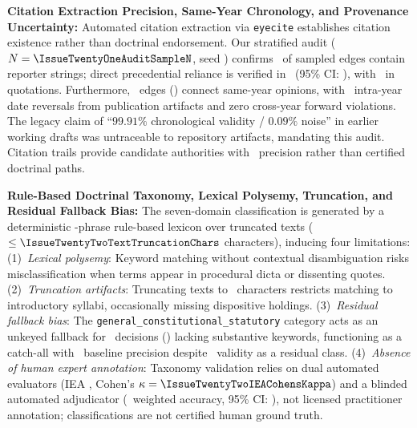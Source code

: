 \item \textbf{Citation Extraction Precision, Same-Year Chronology, and Provenance Uncertainty:}
Automated citation extraction via \texttt{eyecite} establishes citation existence rather than doctrinal endorsement. Our stratified audit ($N=\IssueTwentyOneAuditSampleN$, seed \IssueTwentyOneAuditSeed) confirms \IssueTwentyOneAuditCitationPresentPct\ of sampled edges contain reporter strings; direct precedential reliance is verified in \IssueTwentyOneAuditTargetConfirmedPct\ (95\% CI: \IssueTwentyOneAuditTargetConfirmedCI), with \IssueTwentyOneAuditQuotationPct\ in quotations. Furthermore, \IssueTwentyOneSameYearEdges\ edges (\IssueTwentyOneSameYearEdgesPct) connect same-year opinions, with \IssueTwentyOneIntraYearReversals\ intra-year date reversals from publication artifacts and zero cross-year forward violations. The legacy claim of ``$99.91\%$ chronological validity / $0.09\%$ noise'' in earlier working drafts was untraceable to repository artifacts, mandating this audit. Citation trails provide candidate authorities with \IssueTwentyOneAuditTargetConfirmedPct\ precision rather than certified doctrinal paths.

\item \textbf{Rule-Based Doctrinal Taxonomy, Lexical Polysemy, Truncation, and Residual Fallback Bias:}
The seven-domain classification is generated by a deterministic \IssueTwentyTwoTotalLexiconPhrases-phrase rule-based lexicon over truncated texts ($\le \IssueTwentyTwoTextTruncationChars$ characters), inducing four limitations: (1)~\textit{Lexical polysemy}: Keyword matching without contextual disambiguation risks misclassification when terms appear in procedural dicta or dissenting quotes. (2)~\textit{Truncation artifacts}: Truncating texts to \IssueTwentyTwoTextTruncationChars\ characters restricts matching to introductory syllabi, occasionally missing dispositive holdings. (3)~\textit{Residual fallback bias}: The \texttt{general\_constitutional\_statutory} category acts as an unkeyed fallback for \IssueTwentyTwoGeneralConstitutionalCorpus\ decisions (\IssueTwentyTwoGeneralConstitutionalCorpusPct) lacking substantive keywords, functioning as a catch-all with \IssueTwentyTwoGeneralConstitutionalBaselineAcc\ baseline precision despite \IssueTwentyTwoFallbackValidityPct\ validity as a residual class. (4)~\textit{Absence of human expert annotation}: Taxonomy validation relies on dual automated evaluators (IEA \IssueTwentyTwoIEARawAgreement, Cohen's $\kappa=\IssueTwentyTwoIEACohensKappa$) and a blinded automated adjudicator (\IssueTwentyTwoHorvitzThompsonAccuracy\ weighted accuracy, 95\% CI: \IssueTwentyTwoHorvitzThompsonCI), not licensed practitioner annotation; classifications are not certified human ground truth.

